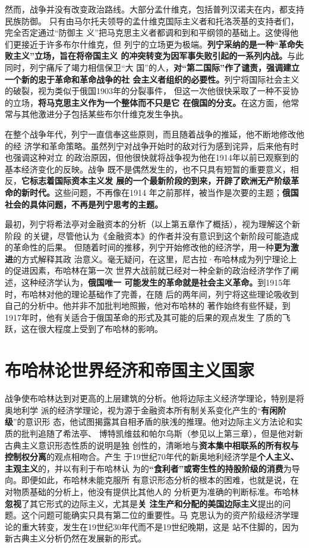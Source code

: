然而，战争并没有改变政治路线。大部分孟什维克，包括普列汉诺夫在内，都支持民族防御。
只有由马尔托夫领导的孟什维克国际主义者和托洛茨基的支持者们，完全否定通过“防御主
义”把马克思主义者都调和到和平纲领的基础上。这使得他们更接近于许多布尔什维克，但
列宁的立场更为极端。\textbf{列宁采纳的是一种“革命失败主义”立场，旨在将帝国主义
  的冲突转变为因军事失败引起的一系列内战。}与此同时，列宁痛斥了竭力相信保卫“大
国”的人，\textbf{对“第二国际”作了谴责，强调建立一个新的忠于革命和革命战争的社
  会主义者组织的必要性。}列宁将国际社会主义的破裂，视为类似于俄国1903年的分裂事件，
但这一次他很快采取了一种不妥协的立场，\textbf{将马克思主义作为一个整体而不只是它
  在俄国的分支。}在这方面，他常常与其他激进分子包括某些布尔什维克发生争执。

在整个战争年代，列宁一直信奉这些原则，而且随着战争的推延，他不断地修改他的经
济学和革命策略。虽然列宁对战争开始时的敌对行为感到诧异，后来他有时也强调这种对立
的政治原因，但他很快就将战争视为他在1914年以前已观察到的基本经济变化的反映。战争
既不是偶然发生的，也不只具有短暂的重要意义，相反，\textbf{它标志着国际资本主义发
展的一个最新阶段的到来，开辟了欧洲无产阶级革命的新时代。}这些问题，不再像在1914
年之前那样，被当作是次要的主题；\textbf{俄国社会的具体问题，不再是列宁思考的主题。}

最初，列宁将希法亭对金融资本的分析（以上第五章作了概括），视为理解这个新阶段
的关键，尽管他认为《金融资本》的作者并没有意识到这个新阶段可能造成的革命性的后果。
但随着时间的推移，列宁开始修改他的经济学，用一种\textbf{更为激进}的方式解释其政
治意义。毫无疑问，在这里，尼古拉·布哈林成为列宁理论上的促进因素，布哈林在第一次
世界大战前就已经对一种全新的政治经济学作了阐述，这种经济学认为，\textbf{俄国唯一
可能发生的革命就是社会主义革命。}到1915年时，布哈林对他的理论基础作了完善，在随
后的两年间，列宁将这些理论吸收到自己的分析中。他并非不加批判地照搬，他对布哈林的
著作始终有些怀疑，到1917年时，他有关适合于俄国革命的形式及其可能的后果的观点发生
了质的飞跃，这在很大程度上受到了布哈林的影响。

\section{布哈林论世界经济和帝国主义国家}

战争使布哈林达到对更高的上层建筑的分析。他将边际主义经济学理论，特别是将奥地利学
派的经济学理论，视为源于金融资本所有制关系变化产生的“\textbf{有闲阶级}”的意识形
态，他试图揭露其自相矛盾的肤浅的推理。他对边际主义方法论和实质的批判追随了希法亭、
博特凯维兹和帕尔乌斯（参见以上第三章），但是他对新古典主义意识形态性质的说明是独
创性的，清晰地与\textbf{资本集中相联系的所有权与控制权分离}的观点相吻合。产生
于19世纪70年代的新奥地利经济学是\textbf{个人主义、主观主义}的，并以有利于布哈林认
为的\textbf{“食利者”或寄生性的持股阶级的消费}为导向。即便如此，布哈林未能克服所
有意识形态分析的根本的困难，也就是说，在对物质基础的分析上，他没有提供比其他人的
分析更为准确的判断标准。布哈林\textbf{忽视}了其它形式的边际主义，尤其是\textbf{关
  注生产和分配的美国边际主义}提出的问题。这个问题可能确实只具有第二位的重要性。马
克思认为的资产阶级经济学理论的重大转变，发生在19世纪30年代而不是19世纪晚期，这是
站不住脚的，因为新古典主义分析仍然在发展新的形式。

